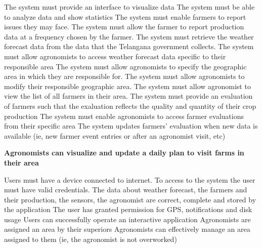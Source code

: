 \begin{itemize}
\begin{itemize}
 The system must provide an interface to visualize data
 The system must be able to analyze data and show statistics
 The system must enable farmers to report issues they may face.
 The system must allow the farmer to report production data at a frequency chosen by the farmer.
 The system must retrieve the weather forecast data from the data that the Telangana government collects.
 The system must allow agronomists to access weather forecast data specific to their responsible area
 The system must allow agronomists to specify the geographic area in which they are responsible for.
 The system must allow agronomists to modify their responsible geographic area.
  The system must allow agronomist to view the list of all farmers in their area.
  The system must provide an evaluation of farmers such that the exaluation reflects the quality and quantity of their crop production
  The system must enable agronomists to access farmer evaluations from their specific area
  The system updates farmers' evaluation when new data is available (ie, new farmer event entries or after an agronomist visit, etc)
\end{itemize}

 \textbf{Agronomists can visualize and update a daily plan to visit farms in their area}
\begin{itemize}
  Users must have a device connected to internet.
 To access to the system the user must have valid credentials.
 The data about weather forecast, the farmers and their production, the sensors, the agronomist are correct, complete and stored by the application
 The user has granted permission for GPS, notifications and disk usage
 Users can successfully operate an interactive application
 Agronomists are assigned an area by their superiors
 Agronomists can effectively manage an area assigned to them (ie, the agronomist is not overworked)



\end{itemize}
\end{itemize}
